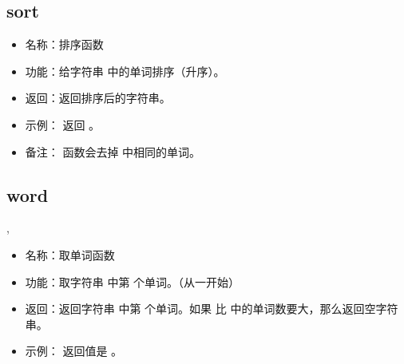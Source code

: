 \documentclass[a4paper,10pt]{sphinxmanual}
\begin{document}
\subsection{sort}
\label{\detokenize{functions:sort}}
\begin{sphinxVerbatim}[commandchars=\\\{\}]
 \PYGZlt{}\PYGZgt{}
\end{sphinxVerbatim}
\begin{itemize}
\item {} 
名称：排序函数

\item {} 
功能：给字符串  中的单词排序（升序）。

\item {} 
返回：返回排序后的字符串。

\item {} 
示例：  返回  。

\item {} 
备注：  函数会去掉  中相同的单词。

\end{itemize}


\subsection{word}
\label{\detokenize{functions:word}}
\begin{sphinxVerbatim}[commandchars=\\\{\}]
 \PYGZlt{}\PYGZgt{},\PYGZlt{}\PYGZgt{}
\end{sphinxVerbatim}
\begin{itemize}
\item {} 
名称：取单词函数

\item {} 
功能：取字符串  中第  个单词。（从一开始）

\item {} 
返回：返回字符串  中第  个单词。如果  比  中的单词数要大，那么返回空字符串。

\item {} 
示例：  返回值是  。

\end{itemize}
\end{document}

